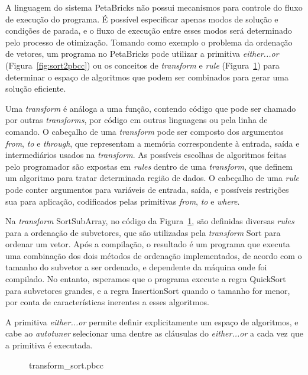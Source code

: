 \documentclass[a4paper, 11pt]{article}
\begin{document}
A linguagem do sistema PetaBricks não possui mecanismos para controle do fluxo
de execução do programa. É possível especificar apenas modos de solução e 
condições de parada, e o fluxo de execução entre esses modos será determinado 
pelo processo de otimização.
Tomando como exemplo o problema da ordenação de vetores, um programa no
PetaBricks pode utilizar a primitiva \emph{either...or} 
(Figura~\ref{fig:sort2pbcc}) ou os conceitos de \emph{transform} e \emph{rule}
(Figura~\ref{fig:sortpbcc}) para determinar o espaço de algoritmos que podem 
ser combinados para gerar uma solução eficiente.

Uma \emph{transform} é análoga a uma função, contendo código que pode
ser chamado por outras \emph{transforms}, por código em outras linguagens
ou pela linha de comando. O cabeçalho de uma \emph{transform} pode ser composto
dos argumentos \emph{from}, \emph{to} e \emph{through}, que representam a
memória correspondente à entrada, saída e intermediários usados na 
\emph{transform}.
As possíveis escolhas de algoritmos feitas pelo programador são expostas 
em \emph{rules} dentro de uma \emph{transform}, que definem um algoritmo
para tratar determinada região de dados. O cabeçalho de uma \emph{rule} pode
conter argumentos para variáveis de entrada, saída, e possíveis restrições sua 
para aplicação, codificados pelas primitivas \emph{from}, \emph{to} e 
\emph{where}.

Na \emph{transform} SortSubArray, no código da Figura~\ref{fig:sortpbcc}, são 
definidas diversas \emph{rules} para a ordenação de subvetores, que
são utilizadas pela \emph{transform} Sort para ordenar um vetor. Após a
compilação, o resultado é um programa que executa uma combinação dos dois
métodos de ordenação implementados, de acordo com o tamanho do subvetor a
ser ordenado, e dependente da máquina onde foi compilado. No entanto, esperamos
que o programa execute a regra QuickSort para subvetores grandes, e a 
regra InsertionSort quando o tamanho for menor, por conta de características
inerentes a esses algoritmos.

A primitiva \emph{either...or} permite definir explicitamente um espaço
de algoritmos, e cabe ao \emph{autotuner} selecionar uma dentre as cláusulas
do \emph{either...or} a cada vez que a primitiva é executada.

\begin{figure}[H]
    \centering
    
    \caption{transform\_sort.pbcc}
    \label{fig:sortpbcc}
\end{figure}
\end{document}
